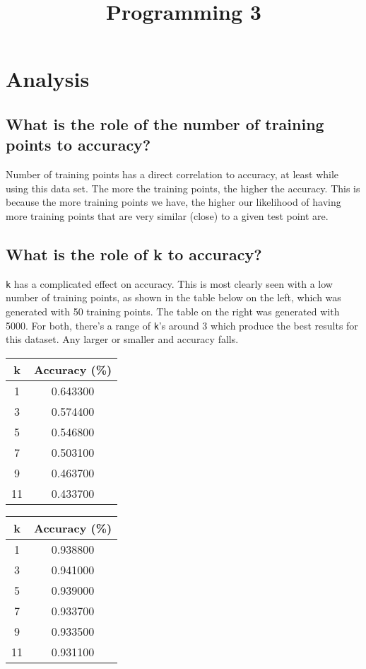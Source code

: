 \documentclass{article}
\title{Programming 3}
\begin{document}
 

\section{Analysis}
\subsection{What is the role of the number of training points to accuracy?
}
Number of training points has a direct correlation to accuracy, at least while using this data set. The more the training points, the higher the accuracy. This is because the more training points we have, the higher our likelihood of having more training points that are very similar (close) to a given test point are.

\subsection{What is the role of k to accuracy?}
\texttt{k} has a complicated effect on accuracy. This is most clearly seen with a low number of training points, as shown in the table below on the left, which was generated with 50 training points. The table on the right was generated with 5000. For both, there's a range of \texttt{k}'s around 3 which produce the best results for this dataset. Any larger or smaller and accuracy falls.

\begin{center}
\begin{tabular}{|c|c|}
\hline
k & Accuracy (\%) \\
\hline
1 & 0.643300 \\
3 & 0.574400 \\ 
5 & 0.546800 \\
7 & 0.503100 \\
9 & 0.463700 \\
11 & 0.433700 \\
\hline
\end{tabular}
\quad
        \begin{tabular}{|c|c|}
\hline
k & Accuracy (\%) \\
\hline
1 & 0.938800 \\
3 & 0.941000 \\ 
5 & 0.939000 \\
7 & 0.933700 \\
9 & 0.933500 \\
11 & 0.931100 \\
\hline
\end{tabular}
\end{center}
\end{document}
